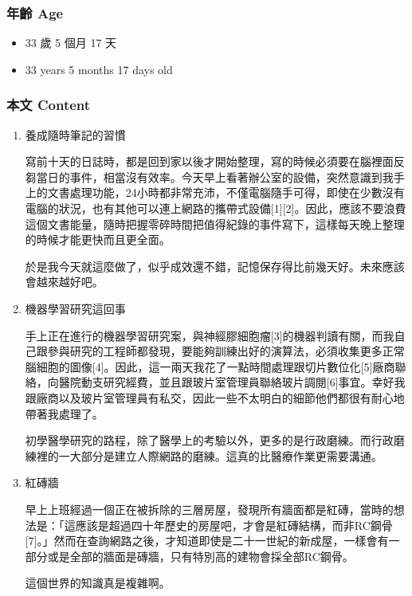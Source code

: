 \documentclass[a5paper, 12pt
]{book}
\providecommand{\tightlist}{%
  \setlength{\itemsep}{0pt}\setlength{\parskip}{0pt}}
\begin{document}
\hypertarget{ux5e74ux9f61-age-10}{%
\subsubsection{年齡 Age}\label{ux5e74ux9f61-age-10}}

\begin{itemize}
\tightlist
\item
  33 歲 5 個月 17 天
\item
  33 years 5 months 17 days old
\end{itemize}

\hypertarget{ux672cux6587-content-10}{%
\subsubsection{本文 Content}\label{ux672cux6587-content-10}}

\begin{enumerate}
\def\labelenumi{\arabic{enumi}.}
\item
  養成隨時筆記的習慣

  寫前十天的日誌時，都是回到家以後才開始整理，寫的時候必須要在腦裡面反芻當日的事件，相當沒有效率。今天早上看著辦公室的設備，突然意識到我手上的文書處理功能，24小時都非常充沛，不僅電腦隨手可得，即使在少數沒有電腦的狀況，也有其他可以連上網路的攜帶式設備{[}1{]}{[}2{]}。因此，應該不要浪費這個文書能量，隨時把握零碎時間把值得紀錄的事件寫下，這樣每天晚上整理的時候才能更快而且更全面。

  於是我今天就這麼做了，似乎成效還不錯，記憶保存得比前幾天好。未來應該會越來越好吧。
\item
  機器學習研究這回事

  手上正在進行的機器學習研究案，與神經膠細胞瘤{[}3{]}的機器判讀有關，而我自己跟參與研究的工程師都發現，要能夠訓練出好的演算法，必須收集更多正常腦細胞的圖像{[}4{]}。因此，這一兩天我花了一點時間處理跟切片數位化{[}5{]}廠商聯絡，向醫院動支研究經費，並且跟玻片室管理員聯絡玻片調閱{[}6{]}事宜。幸好我跟廠商以及玻片室管理員有私交，因此一些不太明白的細節他們都很有耐心地帶著我處理了。

  初學醫學研究的路程，除了醫學上的考驗以外，更多的是行政磨練。而行政磨練裡的一大部分是建立人際網路的磨練。這真的比醫療作業更需要溝通。
\item
  紅磚牆

  早上上班經過一個正在被拆除的三層房屋，發現所有牆面都是紅磚，當時的想法是：「這應該是超過四十年歷史的房屋吧，才會是紅磚結構，而非RC鋼骨{[}7{]}。」然而在查詢網路之後，才知道即使是二十一世紀的新成屋，一樣會有一部分或是全部的牆面是磚牆，只有特別高的建物會採全部RC鋼骨。

  這個世界的知識真是複雜啊。
\end{enumerate}
\end{document}
